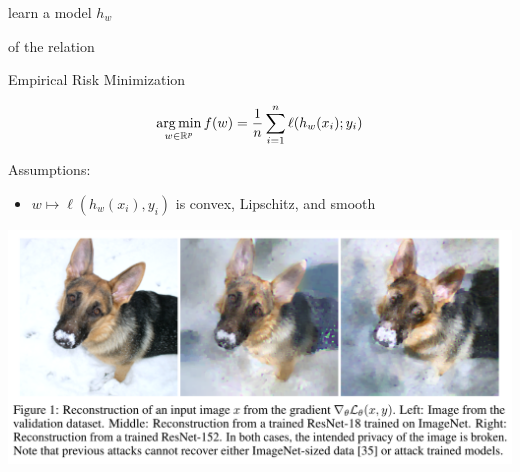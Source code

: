 \documentclass{beamer}
\begin{document}
\begin{frame}
\begin{center}
\begin{minipage}{.5\textwidth}
    \vspace{0.5em}

    \Large
    \hspace{1em}
    learn
    a model $h_w$

    \hspace{1em}
    of the relation
  \end{minipage}
  \end{center}

\end{frame}



\begin{frame}
    \vspace{1em}
  {\Huge
    \begin{center}
      Empirical Risk Minimization
    \end{center}
  }
  \vspace{-0.5em}
  \begin{align*}
    \operatorname*{arg\,min}_{w \in \mathbb R^p} f(w) = \frac 1n \sum_{i=1}^n \ell(h_w(x_i); y_i)
  \end{align*}

  \vspace{1.5em}

  {\Large
  Assumptions:
  \begin{itemize}
  \item $w \mapsto \ell(h_w(x_i),y_i)$ is convex, Lipschitz, and
    smooth
  \end{itemize}
  }

\end{frame}

\begin{frame}
  \begin{center}
    \vspace{2em}
    \includegraphics[width=1\linewidth]{reconstruction_attack.png}
  \end{center}

  \vspace{-1em}
\end{frame}
\end{document}
